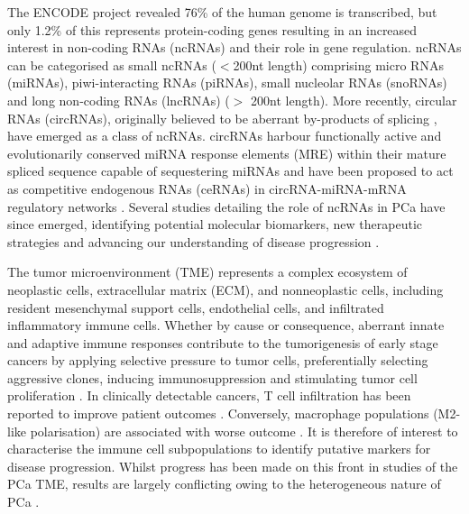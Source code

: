 \documentclass[twocolumn]{bmcart}%
\begin{document}
The ENCODE project revealed 76\% of the human genome is transcribed, but only 1.2\% of this represents protein-coding genes \cite{BibEntry2012Sep, Djebali2012Sep} resulting in an increased interest in non-coding RNAs (ncRNAs) and their role in gene regulation. ncRNAs can be categorised as small ncRNAs ($<$200nt length) comprising micro RNAs (miRNAs), piwi-interacting RNAs (piRNAs), small nucleolar RNAs (snoRNAs) and long non-coding RNAs (lncRNAs) ($>$ 200nt length). More recently, circular RNAs (circRNAs), originally believed to be aberrant by-products of splicing \cite{Cocquerelle1993Jan, Qian1992}, have emerged as a class of ncRNAs. circRNAs harbour functionally active and evolutionarily conserved miRNA response elements (MRE) within their mature spliced sequence capable of sequestering miRNAs and have been proposed to act as competitive endogenous RNAs (ceRNAs) in circRNA-miRNA-mRNA regulatory networks \cite{Thomas2014, Hansen2013, DENZLER2014}. Several studies detailing the role of ncRNAs in PCa have since emerged, identifying potential molecular biomarkers, new therapeutic strategies and advancing our understanding of disease progression \cite{Aird2018Mar, longandshort, Ghiam2017Apr, Ding2021Jun, Takayama}.  \par

The tumor microenvironment (TME) represents a complex ecosystem of neoplastic cells, extracellular matrix (ECM), and nonneoplastic cells, including resident mesenchymal support cells, endothelial cells, and infiltrated inflammatory immune cells. Whether by cause or consequence, aberrant innate and adaptive immune responses contribute to the tumorigenesis of early stage cancers by applying selective pressure to tumor cells, preferentially selecting aggressive clones, inducing immunosuppression and stimulating tumor cell proliferation \cite{Gonzalez2018Oct}. In clinically detectable cancers, T cell infiltration has been reported to improve patient outcomes \cite{Dieu-Nosjean2008Sep}. Conversely, macrophage populations (M2-like polarisation) are associated with worse outcome \cite{Mantovani2017Jul}. It is therefore of interest to characterise the immune cell subpopulations to identify putative markers for disease progression. Whilst progress has been made on this front in studies of the PCa TME, results are largely conflicting owing to the heterogeneous nature of PCa \cite{Apusiga2023Dec}.  
\end{document}
